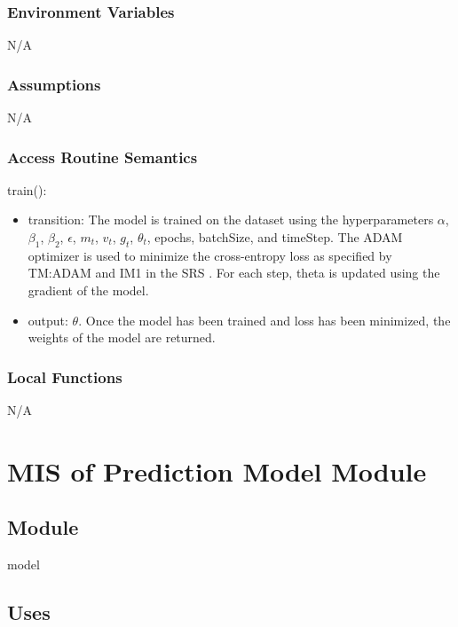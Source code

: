 \documentclass[12pt, titlepage]{article}
\begin{document}
\subsubsection{Environment Variables}

N/A

\subsubsection{Assumptions}

N/A

\subsubsection{Access Routine Semantics}

\noindent train():
\begin{itemize}
\item transition: The model is trained on the dataset using the hyperparameters
$\alpha$, $\beta_1$, $\beta_2$, $\epsilon$, $m_{t}$, $v_{t}$, $g_{t}$,
$\theta_{t}$, epochs, batchSize, and timeStep. The ADAM optimizer is used to
minimize the cross-entropy loss as specified by TM:ADAM \citep[4.2.2]{SRS} and
IM1 in the SRS \citep[4.2.4]{SRS}. For each step, theta is updated using the
gradient of the model.
\item output: $\theta$. Once the model has been trained and loss has been
minimized, the weights of the model are returned.
\end{itemize}

\subsubsection{Local Functions}

N/A


\newpage
\section{MIS of Prediction Model Module} \label{MModel}

\subsection{Module}

model

\subsection{Uses}
\end{document}
